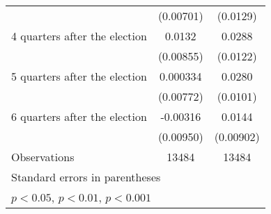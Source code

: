 \begin{table}[htbp]
\begin{tabular}{l*{2}{c}}
                    &   (0.00701)         &    (0.0129)         \\
[1em]
 4 quarters after the election&      0.0132         &      0.0288\sym{*}  \\
                    &   (0.00855)         &    (0.0122)         \\
[1em]
 5 quarters after the election&    0.000334         &      0.0280\sym{**} \\
                    &   (0.00772)         &    (0.0101)         \\
[1em]
 6 quarters after the election&    -0.00316         &      0.0144         \\
                    &   (0.00950)         &   (0.00902)         \\
\hline
Observations        &       13484         &       13484         \\
\hline\hline
\multicolumn{3}{l}{\footnotesize Standard errors in parentheses}\\
\multicolumn{3}{l}{\footnotesize \sym{*} \(p<0.05\), \sym{**} \(p<0.01\), \sym{***} \(p<0.001\)}\\
\end{tabular}
\end{table}
